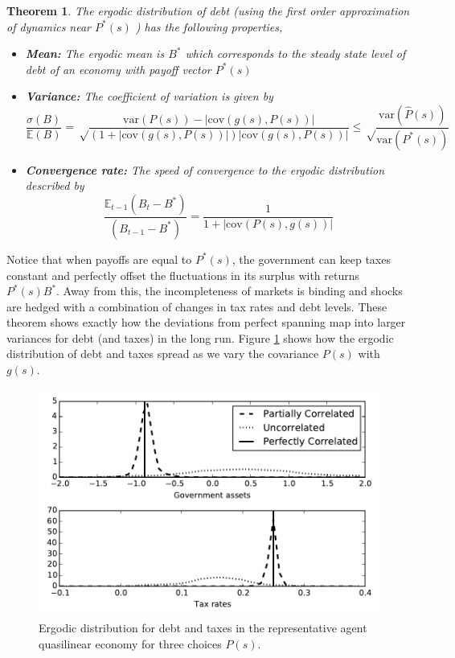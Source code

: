 \documentclass[11.5pt,twoside]{article}
\newtheorem{theorem}{Theorem}
\newcommand{\EE}{\mathbb E}
\newcommand{\var}{\mathrm{var}}
\newcommand{\cov}{\mathrm{cov}}
\begin{document}
\begin{theorem}
\label{thm: rep agent linear policies}
The ergodic distribution of debt (using the first order approximation of dynamics near $P^*(s)$ ) has the following properties,
\begin{itemize}
 \item \textbf{Mean:} The ergodic mean is $B^*$ which corresponds to the steady state level of debt of an economy with payoff vector $P^*(s)$ 
 \item \textbf{Variance:} The coefficient of variation is given by
  \[
    \frac{\sigma(B)}{\mathbb E(B)} = \sqrt\frac{\var(P(s)) - |\cov(g(s),P(s))|}{(1+|\cov(g(s),P(s))|)|\cov(g(s),P(s))|}\leq\sqrt\frac{\var(\hat{P}(s))}{\var(P^*(s))}
  \]
  \item \textbf{Convergence rate:} The speed of convergence to the ergodic distribution described by
  \[
    \frac{\EE_{t-1}(B_t-B^*)}{(B_{t-1} - B^*)} = \frac1{1+|\cov(P(s),g(s))|}
  \]

\end{itemize}
  

\end{theorem}
 Notice that when payoffs are equal to $P^*(s)$, the government can keep taxes constant and perfectly offset the fluctuations in its surplus with returns $P^*(s)B^*$. Away from this, the incompleteness of markets is binding and shocks are hedged with a combination of changes in tax rates and debt levels. These theorem shows  exactly how the deviations from perfect spanning map into larger variances for debt (and taxes) in the long run. Figure \ref{fig: ergodic distribution ql} shows how the ergodic distribution of debt and taxes spread as we vary the covariance $P(s)$ with $g(s)$.
 \begin{figure}[htp]
 \centering
 \includegraphics[width=7in]{plots/ErgodicQL.pdf}
 \caption{Ergodic distribution for debt and taxes in the representative agent quasilinear economy for three choices $P(s)$.}
 \label{fig: ergodic distribution ql}
 \end{figure}
\end{document}
